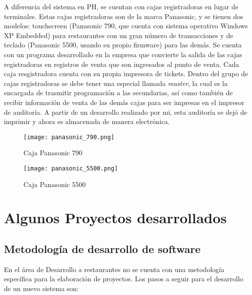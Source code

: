 A diferencia del sistema en PH, se cuentan con cajas registradoras en lugar de terminales. Estas cajas registradoras son de la marca Panasonic, y se tienen dos modelos: touchscreen (Panasonic 790, que cuenta con sistema operativo Windows XP Embedded) para restaurantes con un gran número de transacciones y de teclado (Panasonic 5500, usando su propio firmware) para las demás. Se cuenta con un programa desarrollado en la empresa que convierte la salida de las cajas registradoras en registros de venta que son ingresados al punto de venta. Cada caja resgistradora cuenta con su propia impresora de tickets. Dentro del grupo de cajas registradoras se debe tener una especial llamada \textit{master}, la cual es la encargada de trasmitir programación a las secundarias, así como también de recibir información de venta de las demás cajas para ser impresas en el impresor de auditoría. A partir de un desarrollo realizado por mi, esta auditoría se dejó de imprimir y ahora es almacenada de manera electrónica.

\begin{figure}[htb]
 \begin{center}
  \texttt{[image: panasonic\_790.png]}
 \end{center}
 \caption{Caja Panasonic 790}
 \label{fig:pana_790}
\end{figure}

\begin{figure}[htb]
 \begin{center}
  \texttt{[image: panasonic\_5500.png]}
 \end{center}
 \caption{Caja Panasonic 5500}
 \label{fig:pana_5500}
\end{figure}


\section{Algunos Proyectos desarrollados}
\label{chap:desarrollo}

\subsection{Metodología de desarrollo de software}
\label{sec:metodologia}

En el área de Desarrollo a restaurantes no se cuenta con una metodología específica para la elaboración de proyectos. Los pasos a seguir para el desarrollo de un nuevo sistema son:

